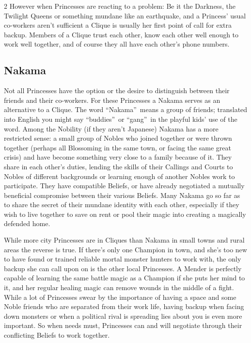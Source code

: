 \begin{multicols}{2}
However when Princesses are reacting to a problem: Be it the Darkness, the Twilight Queens or something mundane like an earthquake, and a Princess' usual co-workers aren't sufficient a Clique is usually her first point of call for extra backup. Members of a Clique trust each other, know each other well enough to work well together, and of course they all have each other's phone numbers. 

\subsection*{Nakama}

Not all Princesses have the option or the desire to distinguish between their friends and their co-workers. For these Princesses a Nakama serves as an alternative to a Clique. The word \textquotedblleft Nakama\textquotedblright\, means a group of friends; translated into English you might say \textquotedblleft buddies\textquotedblright\, or \textquotedblleft gang\textquotedblright\, in the playful kids' use of the word. Among the Nobility (if they aren't Japanese) Nakama has a more restricted sense: a small group of Nobles who joined together or were thrown together (perhaps all Blossoming in the same town, or facing the same great crisis) and have become something very close to a family because of it. They share in each other's duties, lending the skills of their Callings and Courts to Nobles of different backgrounds or learning enough of another Nobles work to participate. They have compatible Beliefs, or have already negotiated a mutually beneficial compromise between their various Beliefs. Many Nakama go so far as to share the secret of their mundane identity with each other, especially if they wish to live together to save on rent or pool their magic into creating a magically defended home. 

While more city Princesses are in Cliques than Nakama in small towns and rural areas the reverse is true. If there's only one Champion in town, and she's too new to have found or trained reliable mortal monster hunters to work with, the only backup she can call upon on is the other local Princesses. A Mender is perfectly capable of learning the same battle magic as a Champion if she puts her mind to it, and her regular healing magic can remove wounds in the middle of a fight. While a lot of Princesses swear by the importance of having a space and some Noble friends who are separated from their work life, having backup when facing down monsters or when a political rival is spreading lies about you is even more important. So when needs must, Princesses can and will negotiate through their conflicting Beliefs to work together. 


\end{multicols}
